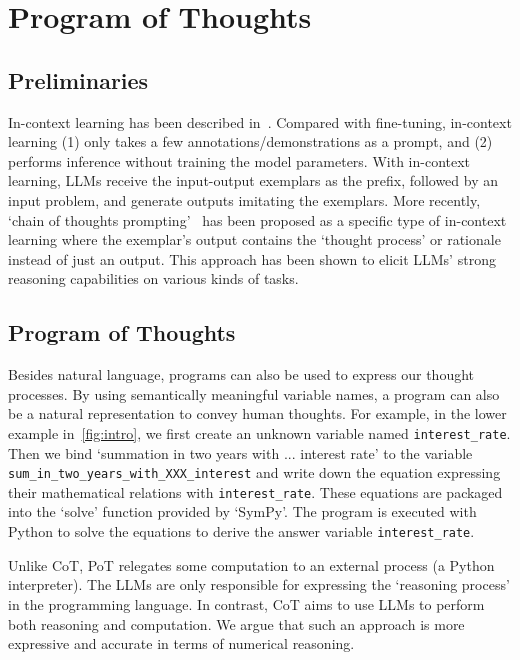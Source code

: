 \section{Program of Thoughts}

\subsection{Preliminaries}
In-context learning has been described in~\cite{brown2020language,chen2021evaluating,chowdhery2022palm,rae2021scaling}. Compared with fine-tuning, in-context learning (1) only takes a few annotations/demonstrations as a prompt, and (2) performs inference without training the model parameters. With in-context learning, LLMs receive the input-output exemplars as the prefix, followed by an input problem, and generate outputs imitating the exemplars. More recently, `chain of thoughts prompting'~\citep{wei2022chain} has been proposed as a specific type of in-context learning where the exemplar's output contains the `thought process' or rationale instead of just an output. This approach has been shown to elicit LLMs' strong reasoning capabilities on various kinds of tasks.

\subsection{Program of Thoughts} Besides natural language, programs can also be used to express our thought processes. By using semantically meaningful variable names, a program can also be a natural representation to convey human thoughts. For example, in the lower example in~\autoref{fig:intro}, we first create an unknown variable named \texttt{interest\_rate}. Then we bind `summation in two years with ... interest rate' to the variable \texttt{sum\_in\_two\_years\_with\_XXX\_interest} and write down the equation expressing their mathematical relations with \texttt{interest\_rate}. These equations are packaged into the `solve' function provided by `SymPy'. The program is executed with Python to solve the equations to derive the answer variable \texttt{interest\_rate}.

Unlike CoT, PoT relegates some computation to an external process (a Python interpreter). The LLMs are only responsible for expressing the `reasoning process' in the programming language. In contrast, CoT aims to use LLMs to perform both reasoning and computation. We argue that such an approach is more expressive and accurate in terms of numerical reasoning.

